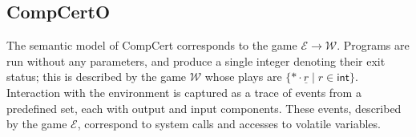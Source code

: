 \documentclass[sigplan,10pt,review,anonymous]{acmart}
\newcommand{\kw}[1]{\ensuremath{ \mathsf{#1} }}
\begin{document}
%
%
%
%
%

\subsection{CompCertO} \label{sec:mainideas:compcerto} %

The semantic model of CompCert corresponds to
the game $\mathcal{E} \rightarrow \mathcal{W}$.
Programs are run without any parameters,
and produce a single integer denoting their exit status;
this is described by the game $\mathcal{W}$
whose plays are $\{ * \cdot \underline{r} \mid r \in \kw{int} \}$.
Interaction with the environment
is captured as a trace of events from a predefined set,
each with output and input components.
These events,
described by the game $\mathcal{E}$,
correspond to system calls and accesses to volatile variables.
\end{document}
